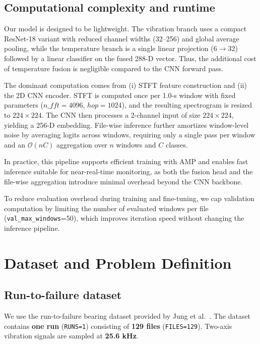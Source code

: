 \documentclass{article}
\begin{document}
\subsection{Computational complexity and runtime}
\label{sec:complexity}

Our model is designed to be lightweight. The vibration branch uses a compact ResNet-18 variant with reduced channel widths (32--256) and global average pooling, while the temperature branch is a single linear projection (6$\rightarrow$32) followed by a linear classifier on the fused 288-D vector. Thus, the additional cost of temperature fusion is negligible compared to the CNN forward pass.

The dominant computation comes from (i) STFT feature construction and (ii) the 2D CNN encoder. STFT is computed once per 1.0-s window with fixed parameters ($n\_{fft}=4096$, $hop=1024$), and the resulting spectrogram is resized to $224\times224$. The CNN then processes a 2-channel input of size $224\times224$, yielding a 256-D embedding. File-wise inference further amortizes window-level noise by averaging logits across windows, requiring only a single pass per window and an $\mathcal{O}(nC)$ aggregation over $n$ windows and $C$ classes.

In practice, this pipeline supports efficient training with AMP and enables fast inference suitable for near-real-time monitoring, as both the fusion head and the file-wise aggregation introduce minimal overhead beyond the CNN backbone.

To reduce evaluation overhead during training and fine-tuning, we cap validation computation by limiting the number of evaluated windows per file (\texttt{val\_max\_windows}=50), which improves iteration speed without changing the inference pipeline.

\section{Dataset and Problem Definition}
\label{sec:data_problem}

\subsection{Run-to-failure dataset}
We use the run-to-failure bearing dataset provided by Jung et al.~\cite{jung2024dib_rtf,jung2024mendeley_rtf}. 
The dataset contains \textbf{one run} (\texttt{RUNS=1}) consisting of \textbf{129 files} (\texttt{FILES=129}). 
Two-axis vibration signals are sampled at \textbf{25.6 kHz}.
\end{document}
